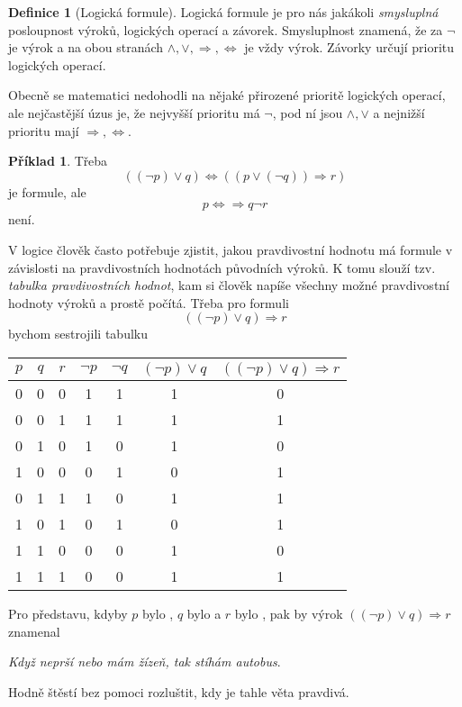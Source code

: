 \documentclass[a4paper,11pt]{article}
\theoremstyle{definition}
\newtheorem{exm}[thm]{Příklad}
\newtheorem{dfn}[thm]{Definice}
\begin{document}
\begin{dfn}[Logická formule]
 Logická formule je pro nás jakákoli \emph{smysluplná} posloupnost výroků,
 logických operací a závorek. Smysluplnost znamená, že za $\neg$ je výrok a na
 obou stranách $ \wedge , \vee , \Rightarrow , \Leftrightarrow $ je vždy výrok.
 Závorky určují prioritu logických operací.
\end{dfn}

Obecně se matematici nedohodli na nějaké přirozené prioritě logických operací,
ale nejčastější úzus je, že nejvyšší prioritu má $\neg$, pod ní jsou  $ \wedge ,
\vee $ a nejnižší prioritu mají $ \Rightarrow , \Leftrightarrow $.

\begin{exm}
 \label{exm:formula}
 Třeba
 \[
  ((\neg p) \vee q) \Leftrightarrow ((p \vee (\neg q)) \Rightarrow r) 
 \]
 je formule, ale
 \[
  p \Leftrightarrow  \Rightarrow q \neg r
 \]
 není.
\end{exm}

V logice člověk často potřebuje zjistit, jakou pravdivostní hodnotu má formule v
závislosti na pravdivostních hodnotách původních výroků. K tomu slouží tzv.
\emph{tabulka pravdivostních hodnot}, kam si člověk napíše všechny možné
pravdivostní hodnoty výroků a prostě počítá. Třeba pro formuli 
\[
 ((\neg p) \vee q) \Rightarrow r
\]
bychom sestrojili tabulku

\begin{center}
 \begin{tabular}{c|c|c|c|c|c|c}
  $p$ & $q$ & $r$ & $\neg p$ & $\neg q$ & $(\neg p) \vee q$ & $((\neg p) \vee q)
  \Rightarrow r$\\
  \midrule
  0 & 0 & 0 & 1 & 1 & 1 & 0\\
  0 & 0 & 1 & 1 & 1 & 1 & 1\\
  0 & 1 & 0 & 1 & 0 & 1 & 0\\
  1 & 0 & 0 & 0 & 1 & 0 & 1\\
  0 & 1 & 1 & 1 & 0 & 1 & 1\\
  1 & 0 & 1 & 0 & 1 & 0 & 1\\
  1 & 1 & 0 & 0 & 0 & 1 & 0\\
  1 & 1 & 1 & 0 & 0 & 1 & 1
 \end{tabular}
\end{center}

Pro představu, kdyby $p$ bylo , $q$ bylo  a $r$ bylo
, pak by výrok $((\neg p) \vee q) \Rightarrow r$ znamenal
\begin{center}
 \emph{Když neprší nebo mám žízeň, tak stíhám autobus}.
\end{center}
Hodně štěstí bez pomoci rozluštit, kdy je tahle věta pravdivá.
\end{document}
